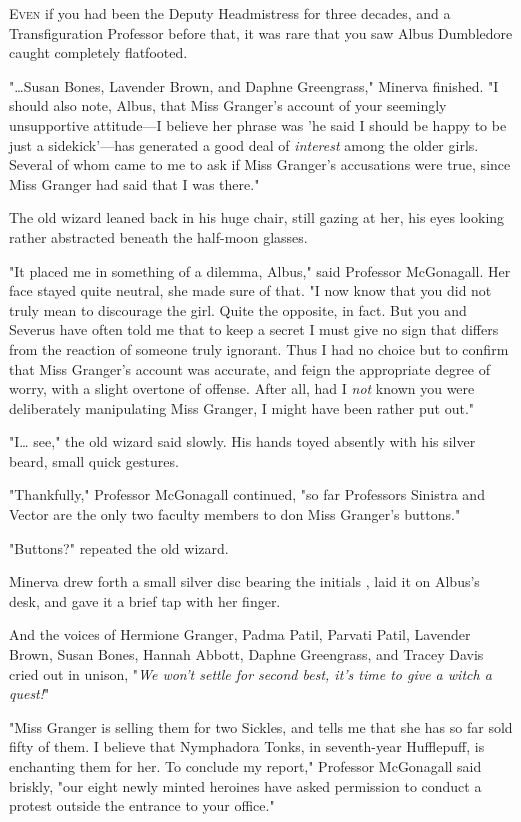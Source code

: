 
\lettrine{E}{ven} if you had 
been the Deputy Headmistress for three decades, and a Transfiguration Professor 
before that, it was rare that you saw Albus Dumbledore caught completely 
flatfooted.

"{\ldots}Susan Bones, Lavender Brown, and Daphne Greengrass," Minerva finished. 
"I should also note, Albus, that Miss Granger's account of your seemingly 
unsupportive attitude---I believe her phrase was 'he said I should be happy to 
be just a sidekick'---has generated a good deal of \emph{interest} among the 
older girls. Several of whom came to me to ask if Miss Granger's accusations 
were true, since Miss Granger had said that I was there."

The old wizard leaned back in his huge chair, still gazing at her, his eyes 
looking rather abstracted beneath the half-moon glasses.

"It placed me in something of a dilemma, Albus," said Professor McGonagall. Her 
face stayed quite neutral, she made sure of that. "I now know that you did not 
truly mean to discourage the girl. Quite the opposite, in fact. But you and 
Severus have often told me that to keep a secret I must give no sign that 
differs from the reaction of someone truly ignorant. Thus I had no choice but 
to confirm that Miss Granger's account was accurate, and feign the appropriate 
degree of worry, with a slight overtone of offense. After all, had I \emph{not} 
known you were deliberately manipulating Miss Granger, I might have been rather 
put out."

"I{\ldots} see," the old wizard said slowly. His hands toyed absently with his 
silver beard, small quick gestures.

"Thankfully," Professor McGonagall continued, "so far Professors Sinistra and 
Vector are the only two faculty members to don Miss Granger's buttons."

"Buttons?" repeated the old wizard.

Minerva drew forth a small silver disc bearing the initials \SPHEW, laid it 
on Albus's desk, and gave it a brief tap with her finger.

And the voices of Hermione Granger, Padma Patil, Parvati Patil, Lavender Brown, 
Susan Bones, Hannah Abbott, Daphne Greengrass, and Tracey Davis cried out in 
unison, "\emph{We won't settle for second best, it's time to give a witch a 
quest!}"

"Miss Granger is selling them for two Sickles, and tells me that she has so far 
sold fifty of them. I believe that Nymphadora Tonks, in seventh-year 
Hufflepuff, is enchanting them for her. To conclude my report," Professor 
McGonagall said briskly, "our eight newly minted heroines have asked permission 
to conduct a protest outside the entrance to your office."

